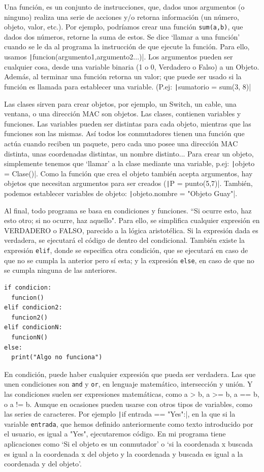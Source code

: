 \documentclass[a4paper, 11pt]{report} %
\begin{document}
Una función, es un conjunto de instrucciones, que, dados unos argumentos (o ninguno) realiza una serie de acciones y/o retorna información (un número, objeto, valor, etc.). Por ejemplo, podríamos crear una función \texttt{sum(a,b)}, que dados dos números, retorne la suma de estos. Se dice `llamar a una función' cuando se le da al programa la instrucción de que ejecute la función. Para ello, usamos \texttt|funcion(argumento1,argumento2...)|. Los argumentos pueden ser cualquier cosa, desde una variable binaria (1 o 0, Verdadero o Falso) a un Objeto. Además, al terminar una función retorna un valor; que puede ser usado si la función es llamada para establecer una variable. (P.ej: \texttt|sumatorio = sum(3, 8)|

Las clases sirven para crear objetos, por ejemplo, un Switch, un cable, una ventana, o una dirección MAC son objetos. Las clases, contienen variables y funciones. Las variables pueden ser distintas para cada objeto, mientras que las funciones son las mismas. Así todos los conmutadores tienen una función que actúa cuando reciben un paquete, pero cada uno posee una dirección MAC distinta, unas coordenadas distintas, un nombre distinto... Para crear un objeto, simplemente tenemos que `llamar' a la clase mediante una variable, p.ej: \texttt|objeto = Clase()|. Como la función que crea el objeto también acepta argumentos, hay objetos que necesitan argumentos para ser creados (\texttt|P = punto(5,7)|. También, podemos establecer variables de objeto: \texttt|objeto.nombre = "Objeto Guay"|.

Al final, todo programa se basa en condiciones y funciones. ``Si ocurre esto, haz esto otro; si no ocurre, haz aquello". Para ello, se simplifica cualquier expresión en VERDADERO o FALSO, parecido a la lógica aristotélica. Si la expresión dada es verdadera, se ejecutará el código de dentro del condicional. También existe la expresión \texttt{elif}, donde se especifica otra condición, que se ejecutará en caso de que no se cumpla la anterior pero sí esta; y la expresión \texttt{else}, en caso de que no se cumpla ninguna de las anteriores.
\begin{verbatim}
if condicion:
  funcion()
elif condicion2:
  funcion2()
elif condicionN:
  funcionN()
else:
  print("Algo no funciona")
\end{verbatim}
En condición, puede haber cualquier expresión que pueda ser verdadera. Las que unen condiciones son \texttt{and} y \texttt{or}, en lenguaje matemático, intersección y unión. Y las condiciones suelen ser expresiones matemáticas, como a > b, a >= b, a == b, o a != b. Aunque en ocasiones pueden usarse con otros tipos de variables, como las series de caracteres. Por ejemplo \texttt|if entrada == "Yes":|, en la que si la variable \texttt{entrada}, que hemos definido anteriormente como texto introducido por el usuario, es igual a "Yes", ejecutaremos código. En mi programa tiene aplicaciones como `Si el objeto es un conmutador' o `si la coordenada x buscada es igual a la coordenada x del objeto y la coordenada y buscada es igual a la coordenada y del objeto'.
\end{document}

